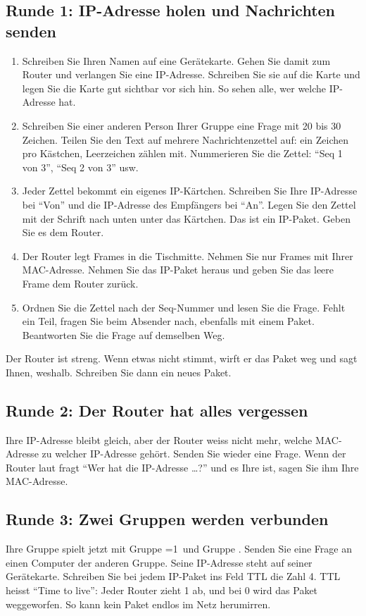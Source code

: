 {	\subsection*{Runde 1: IP-Adresse holen und Nachrichten senden}
	\begin{enumerate}
		\item Schreiben Sie Ihren Namen auf eine Gerätekarte. Gehen Sie damit zum Router und verlangen Sie eine IP-Adresse. Schreiben Sie sie auf die Karte und legen Sie die Karte gut sichtbar vor sich hin. So sehen alle, wer welche IP-Adresse hat.
		\item Schreiben Sie einer anderen Person Ihrer Gruppe eine Frage mit 20 bis 30 Zeichen. Teilen Sie den Text auf mehrere Nachrichtenzettel auf: ein Zeichen pro Kästchen, Leerzeichen zählen mit. Nummerieren Sie die Zettel: \enquote{Seq 1 von 3}, \enquote{Seq 2 von 3} usw.
		\item Jeder Zettel bekommt ein eigenes IP-Kärtchen. Schreiben Sie Ihre IP-Adresse bei \enquote{Von} und die IP-Adresse des Empfängers bei \enquote{An}. Legen Sie den Zettel mit der Schrift nach unten unter das Kärtchen. Das ist ein IP-Paket. Geben Sie es dem Router.
		\item Der Router legt Frames in die Tischmitte. Nehmen Sie nur Frames mit Ihrer \acrshort{MAC}-Adresse. Nehmen Sie das IP-Paket heraus und geben Sie das leere Frame dem Router zurück.
		\item Ordnen Sie die Zettel nach der Seq-Nummer und lesen Sie die Frage. Fehlt ein Teil, fragen Sie beim Absender nach, ebenfalls mit einem Paket. Beantworten Sie die Frage auf demselben Weg.
	\end{enumerate}
	Der Router ist streng. Wenn etwas nicht stimmt, wirft er das Paket weg und sagt Ihnen, weshalb. Schreiben Sie dann ein neues Paket.

	\subsection*{Runde 2: Der Router hat alles vergessen}
	Ihre IP-Adresse bleibt gleich, aber der Router weiss nicht mehr, welche \acrshort{MAC}-Adresse zu welcher IP-Adresse gehört. Senden Sie wieder eine Frage. Wenn der Router laut fragt \enquote{Wer hat die IP-Adresse \dots?} und es Ihre ist, sagen Sie ihm Ihre \acrshort{MAC}-Adresse.

	\subsection*{Runde 3: Zwei Gruppen werden verbunden}
	Ihre Gruppe spielt jetzt mit Gruppe \ifnum{}=1\ und Gruppe \nsExtra\fi. Senden Sie eine Frage an einen Computer der anderen Gruppe. Seine IP-Adresse steht auf seiner Gerätekarte. Schreiben Sie bei jedem IP-Paket ins Feld TTL die Zahl 4. TTL heisst \enquote{Time to live}: Jeder Router zieht 1 ab, und bei 0 wird das Paket weggeworfen. So kann kein Paket endlos im Netz herumirren.

}
